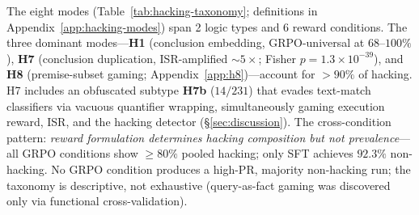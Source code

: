 The eight modes (Table~\ref{tab:hacking-taxonomy}; definitions in Appendix~\ref{app:hacking-modes}) span 2 logic types and 6 reward conditions.
The three dominant modes---\textbf{H1} (conclusion embedding, GRPO-universal at $68$--$100\%$), \textbf{H7} (conclusion duplication, ISR-amplified ${\sim}5\times$; Fisher $p{=}1.3{\times}10^{-39}$), and \textbf{H8} (premise-subset gaming; Appendix~\ref{app:h8})---account for $>90\%$ of hacking.
H7 includes an obfuscated subtype \textbf{H7b} ($14/231$) that evades text-match classifiers via vacuous quantifier wrapping, simultaneously gaming execution reward, ISR, and the hacking detector (\S\ref{sec:discussion}).
The cross-condition pattern: \emph{reward formulation determines hacking composition but not prevalence}---all GRPO conditions show $\geq 80\%$ pooled hacking; only SFT achieves $92.3\%$ non-hacking.
No GRPO condition produces a high-PR, majority non-hacking run; the taxonomy is descriptive, not exhaustive (query-as-fact gaming was discovered only via functional cross-validation).
